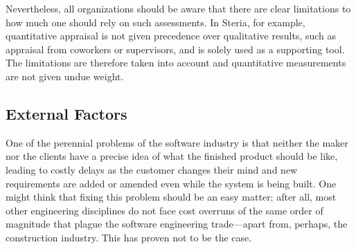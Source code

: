 \documentclass[letterpaper, 12pt]{report}
\begin{document}
Nevertheless, all organizations should be aware that there are clear limitations to how much one should rely on such assessments. 
In Steria, for example, quantitative appraisal is not given precedence over qualitative results, such as appraisal from coworkers or supervisors, and is solely used as a supporting tool. 
The limitations are therefore taken into account and quantitative measurements are not given undue weight.



% 





\subsection{External Factors}
One of the perennial problems of the software industry is that neither the maker nor the clients have a precise idea of what the finished product should be like, leading to costly delays as the customer changes their mind and new requirements are added or amended even while the system is being built.
One might think that fixing this problem should be an easy matter; after all, most other engineering disciplines do not face cost overruns of the same order of magnitude that plague the software engineering trade---apart from, perhaps, the construction industry. 
This has proven not to be the case. 
\end{document}
